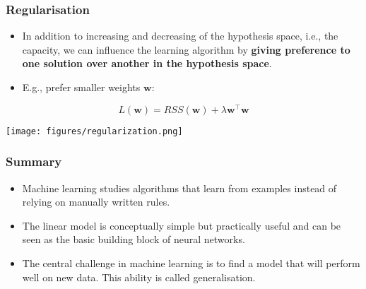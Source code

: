 \documentclass[notes]{beamer}          %
\newif\iffull
\begin{document}
\begin{frame}
\frametitle{Regularisation}
    \begin{itemize}
        \item In addition to increasing and decreasing of the hypothesis space, i.e., the capacity, we can influence the learning algorithm by \textbf{giving preference to one solution over another in the hypothesis space}.
	\iffull
        \item In case both functions are eligible we can define a condition to express preference about one of the functions.
        \item The less preferred solution is chosen only if it gives significantly better performance with the training data.
        \pause
        \fi
	\item E.g., prefer smaller weights $\mathbf{w}$:
	\end{itemize}

	$$L(\mathbf{w}) = RSS(\mathbf{w}) + \lambda \mathbf{w}^{\intercal} \mathbf{w}$$
     
     
     \begin{center}
        \texttt{[image: figures/regularization.png]}
    \end{center}
\end{frame}


\begin{frame}
\frametitle{Summary}
\begin{itemize}
    \item Machine learning studies algorithms that learn from examples instead of relying on manually written rules. 
    \item The linear model is conceptually simple but practically useful and can be seen as the basic building block of neural networks.
    \item The central challenge in machine learning is to find a model that will perform well on new data. This ability is called generalisation.
\end{itemize}
\end{frame}
\end{document}
